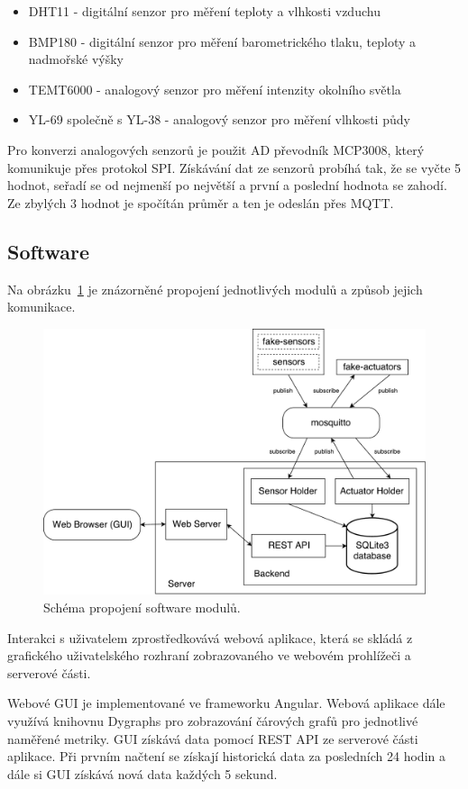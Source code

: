 \documentclass[11pt,a4paper]{article}
\begin{document}
\begin{itemize}
    \item DHT11 - digitální senzor pro měření teploty a vlhkosti vzduchu
    \item BMP180 - digitální senzor pro měření barometrického tlaku, teploty a nadmořské výšky
    \item TEMT6000 - analogový senzor pro měření intenzity okolního světla
    \item YL-69 společně s YL-38 - analogový senzor pro měření vlhkosti půdy
\end{itemize}

Pro konverzi analogových senzorů je použit AD převodník MCP3008, který komunikuje přes protokol SPI. Získávání dat ze senzorů probíhá tak, že se vyčte 5 hodnot, seřadí se od nejmenší po největší a první a poslední hodnota se zahodí. Ze zbylých 3 hodnot je spočítán průměr a ten je odeslán přes MQTT.


\subsection{Software}\label{subsec:sw}
Na obrázku~\ref{fig:sw-scheme} je znázorněné propojení jednotlivých modulů a způsob jejich komunikace.

\begin{figure}[htb]
    \centering
    \includegraphics[width=0.75\linewidth]{sw-scheme}
    \caption{Schéma propojení software modulů.}
    \label{fig:sw-scheme}
\end{figure}

Interakci s uživatelem zprostředkovává webová aplikace, která se skládá z grafického uživatelského rozhraní zobrazovaného ve webovém prohlížeči a serverové části.

Webové GUI je implementované ve frameworku Angular. Webová aplikace dále využívá knihovnu Dygraphs pro zobrazování čárových grafů pro jednotlivé naměřené metriky. GUI získává data pomocí REST API ze serverové části aplikace. Při prvním načtení se získají historická data za posledních 24 hodin a dále si GUI získává nová data každých 5 sekund.
\end{document}
